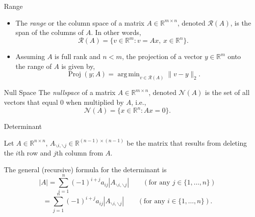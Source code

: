 \documentclass[aspectratio=169,12pt]{beamer}
\DeclareMathOperator*{\argmin}{arg\,min}
\DeclareMathOperator{\Proj}{Proj}
\begin{document}
\begin{frame}[t]{Range}
  \vspace{0.08cm}
  {\small
  \begin{itemize}
    \setlength{\itemsep}{0.34cm}
    \item The \emph{range} or the column space of a matrix
          $A\in\mathbb{R}^{m\times n}$, denoted $\mathcal{R}(A)$, is the span of
          the columns of $A$. In other words,
          \[
            \mathcal{R}(A)=\{v\in\mathbb{R}^{m}:v=Ax,\ x\in\mathbb{R}^{n}\}.
          \]
    \item Assuming $A$ is full rank and $n<m$, the projection of a vector
          $y\in\mathbb{R}^{m}$ onto the range of $A$ is given by,
          \[
            \Proj(y;A)=\argmin_{v\in\mathcal{R}(A)}\|v-y\|_2.
          \]
  \end{itemize}
  }
\end{frame}

\begin{frame}[t]{Null Space}
  \vspace{1.10cm}
  {\large
  The \emph{nullspace} of a matrix $A\in\mathbb{R}^{m\times n}$, denoted
  $\mathcal{N}(A)$ is the set of all vectors that equal $0$ when multiplied by
  $A$, i.e.,
  \[
    \mathcal{N}(A)=\{x\in\mathbb{R}^{n}:Ax=0\}.
  \]
  }
\end{frame}

\begin{frame}[t]{Determinant}
  \vspace{0.20cm}
  {\small
  Let $A\in\mathbb{R}^{n\times n}$,
  $A_{\backslash i,\backslash j}\in\mathbb{R}^{(n-1)\times(n-1)}$ be the matrix
  that results from deleting the $i$th row and $j$th column from $A$.

  The general (recursive) formula for the determinant is
  \[
    |A|=\sum_{i=1}^{n}(-1)^{i+j}a_{ij}|A_{\backslash i,\backslash j}|
    \qquad (\text{for any }j\in\{1,\ldots,n\})
  \]
  \[
    =\sum_{j=1}^{n}(-1)^{i+j}a_{ij}|A_{\backslash i,\backslash j}|
    \qquad (\text{for any }i\in\{1,\ldots,n\}).
  \]
  }
\end{frame}
\end{document}
